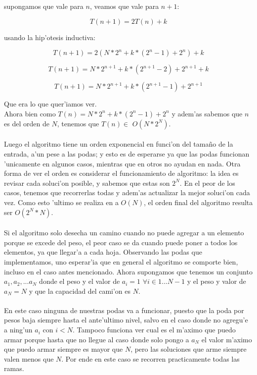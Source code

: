 supongamos que vale para $n$, veamos que vale para $n+1$:

$$T(n+1) = 2T(n) + k$$

usando la hip'otesis inductiva:

$$T(n+1) = 2(N*2^n + k*(2^n-1) + 2^n) + k$$

$$T(n+1) = N*2^{n+1} + k*(2^{n+1}-2) + 2^{n+1} + k$$

$$T(n+1) = N*2^{n+1} + k*(2^{n+1}-1) + 2^{n+1}$$

Que era lo que quer'iamos ver.\\

Ahora bien como $T(n) = N*2^n + k*(2^n-1) + 2^n$ y adem'as sabemos que $n$ es del orden de $N$, tenemos que $T(n) \in$ $O(N*2^N)$.
\paragraph{}
Luego el algoritmo tiene un orden exponencial en funci'on del tama\~{n}o de la entrada, a'un pese a las podas; 
y esto es de esperarse ya que las podas funcionan 'unicamente en algunos casos, mientras que en otros no ayudan 
en nada. Otra forma de ver el orden es considerar el funcionamiento de algoritmo: la idea es revisar cada soluci'on 
posible, y sabemos que estas son $2^N$. En el peor de los casos, tenemos que recorrerlas todas y adem'as actualizar 
la mejor soluci'on cada vez. Como esto 'ultimo se realiza en a $O(N)$, el orden final del algoritmo resulta ser $O(2^N*N)$.
\paragraph{}
Si el algoritmo solo desecha un camino cuando no puede agregar a un elemento porque se excede del peso, el peor 
caso se da cuando puede poner a todos los elementos, ya que llegar'a a cada hoja. Observando las podas que implementamos, 
uno esperar'ia que en general el algoritmo se comporte bien, incluso en el caso antes mencionado. Ahora supongamos que 
tenemos un conjunto ${a_1,a_2,...a_N}$ donde el peso y el valor de $a_i = 1$ $\forall i \in {1...N-1}$ y el peso y valor de  
$a_N = N$ y que la capacidad del cami'on es $N$.
\paragraph{}
En este caso ninguna de nuestras podas va a funcionar, puesto que la poda por pesos baja siempre hasta el ante'ultimo nivel,
salvo en el caso donde no agregu'e a ning'un $a_i$ con $i < N$. Tampoco funciona ver cual es el m'aximo que puedo armar 
porque hasta que no llegue al caso donde solo pongo a $a_N$ el valor m'aximo que puedo armar siempre es mayor que $N$, 
pero las soluciones que arme siempre valen menos que $N$. Por ende en este caso se recorren practicamente todas las ramas. 

